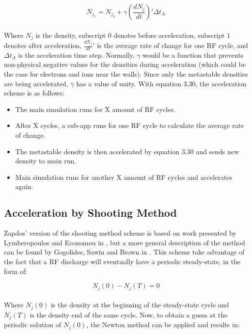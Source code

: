 \documentclass[final]{report}
\begin{document}
  \begin{equation}
      N_{j_1} = N_{j_0} + \gamma \left( \frac{dN_{j}}{dt} \right)'\Delta t_{A}
  \end{equation}
  \\
  Where $N_{j}$ is the density, subscript $0$ denotes before acceleration, subscript $1$ denotes after acceleration, $\frac{dN_{j}}{dt}'$ is the average rate of change for one RF cycle, and $\Delta t_{A}$ is the acceleration time step. Normally, $\gamma$ would be a function that prevents non-physical negative values for the densities during acceleration (which could be the case for electrons and ions near the walls). Since only the metastable densities are being accelerated, $\gamma$ has a value of unity. With equation 3.30, the acceleration scheme is as follows:

  \begin{itemize}
      \item The main simulation runs for X amount of RF cycles.
      \item After X cycles, a sub-app runs for one RF cycle to calculate the average rate of change.
      \item The metastable density is then accelerated by equation 3.30 and sends new density to main run.
      \item Main simulation runs for another X amount of RF cycles and accelerates again.
  \end{itemize}

  \subsection{Acceleration by Shooting Method}

  Zapdos' version of the shooting method scheme is based on work presented by Lymberopoulos and Economou in \cite{1D_GEC}, but a more general description of the method can be found by Gogolides, Sawin and Brown in \cite{ShootingMethod}. This scheme take advantage of the fact that a RF discharge will eventually have a periodic steady-state, in the form of:

  \begin{equation}
      N_{j}(0)-N_{j}(T)=0
  \end{equation}
  \\
  Where $N_{j}(0)$ is the density at the beginning of the steady-state cycle and $N_{j}(T)$ is the density end of the same cycle. Now, to obtain a guess at the periodic solution of $N_{j}(0)$, the Newton method can be applied and results in:
\end{document}
